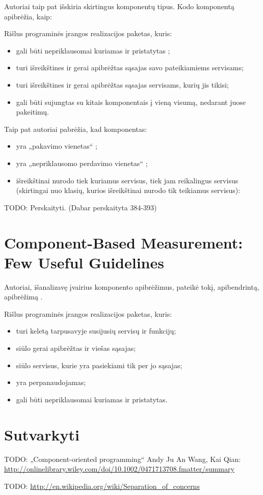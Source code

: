 Autoriai taip pat išskiria skirtingus komponentų tipus. Kodo komponentą
apibrėžia, kaip\cite[386]{objects-components-and-frameworks-with-uml}:
\begin{defn}
  Rišlus programinės įrangos realizacijos  paketas,
  kuris:
  \begin{itemize}
    \item gali būti nepriklausomai kuriamas ir pristatytas ;
    \item turi išreikštines ir gerai apibrėžtas sąsajas savo pateikiamiems
      servisams;
    \item turi išreikštines ir gerai apibrėžtas sąsajas servisams, kurių
      jis tikisi;
    \item gali būti sujungtas su kitais komponentais į vieną visumą,
      nedarant juose pakeitimų.
  \end{itemize}
\end{defn}

Taip pat autoriai pabrėžia, kad komponentas:
\begin{itemize}
  \item yra „pakavimo vienetas“ %
    \cite[387]{objects-components-and-frameworks-with-uml};
  \item yra „nepriklausomo perdavimo vienetas“ \cite[387]{objects-components-and-frameworks-with-uml};
  \item išreikštinai nurodo tiek kuriamus servisus, tiek jam
    reikalingus servisus (skirtingai nuo klasių, kurios išreikštinai
    nurodo tik teikiamus servisus):
\end{itemize}

TODO: Perskaityti. (Dabar perskaityta 384-393)

\section{Component-Based Measurement: Few Useful Guidelines}

Autoriai, išanalizavę įvairius komponento apibrėžimus, pateikė tokį,
apibendrintą, apibrėžimą \cite[2]{Gill:2003:CMF:966221.966237}.
\begin{defn}[Komponentas]
  Rišlus programinės įrangos realizacijos paketas, kuris:
  \begin{itemize}
    \item turi keletą tarpusavyje susijusių servisų ir funkcijų;
    \item siūlo gerai apibrėžtas ir viešas sąsajas;
    \item siūlo servisus, kurie yra pasiekiami tik per jo sąsajas;
    \item yra perpanaudojamas;
    \item gali būti nepriklausomai kuriamas ir pristatytas.
  \end{itemize}
\end{defn}

\section{Sutvarkyti}

TODO: „Component-oriented programming“ Andy Ju An Wang, Kai Qian:
\url{http://onlinelibrary.wiley.com/doi/10.1002/0471713708.fmatter/summary}

TODO: \url{http://en.wikipedia.org/wiki/Separation_of_concerns}
